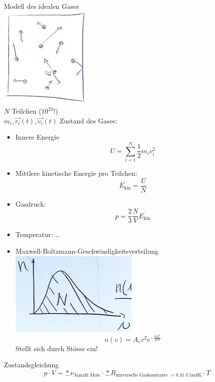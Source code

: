 \begin{rep*}[ note = Thermodynamik ]
	Modell des idealen Gases \\
	\includegraphics{Bild117} \\
	$N$ Teilchen ($10^{23}$!) \\
	$m_i , \vec{r_i}(t) , \vec{v_i}(t)$
	Zustand des Gases:
	\begin{itemize}
		\item Innere Energie
			\[ U = \sum_{i = 1}^N \frac{1}{2} m_i v_i^2 \]
		\item Mittlere kinetische Energie pro Teilchen:
			\[ \overline{E_{\text{kin}}} = \frac{U}{N} \]
		\item Gasdruck:
			\[ p = \frac{2}{3} \frac{N}{V} \overline{E_{\text{kin}}} \]
		\item Temperatur: \dots
		\item Maxwell-Boltzmann-Geschwindigkeitsverteilung \\
			\includegraphics{Bild118}
			\[ n(v) = A_v v^2 e^{-\frac{m v^2}{2kT}} \]
			Stellt sich durch Stösse ein!
	\end{itemize}
	
	Zustandsgleichung
	\[ p \cdot V = \underbrace*{\nu}_{\text{Anzahl Mole}} \cdot \underbrace*{R}_{\text{universelle Gaskonstante } = \SI{8.31}{\joule\per\mole\kelvin}} \cdot T \]
\end{rep*}

